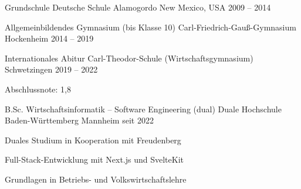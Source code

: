 \documentclass[11pt, a4paper]{awesome-cv}
\begin{document}
\makecvheader


\begin{cventries}

\cventry
  {Grundschule}
  {Deutsche Schule Alamogordo}
  {New Mexico, USA}
  {2009 -- 2014}
  {}

\cventry
  {Allgemeinbildendes Gymnasium (bis Klasse 10)}
  {Carl-Friedrich-Gauß-Gymnasium}
  {Hockenheim}
  {2014 -- 2019}
  {}

\cventry
  {Internationales Abitur}
  {Carl-Theodor-Schule (Wirtschaftsgymnasium)}
  {Schwetzingen}
  {2019 -- 2022}
  {
    \begin{cvitems}
      \item {Abschlussnote: 1,8}
    \end{cvitems}
  }

\cventry
  {B.Sc. Wirtschaftsinformatik – Software Engineering (dual)}
  {Duale Hochschule Baden-Württemberg}
  {Mannheim}
  {seit 2022}
  {
    \begin{cvitems}
      \item {Duales Studium in Kooperation mit Freudenberg}
      \item {Full-Stack-Entwicklung mit Next.js und SvelteKit}
      \item {Grundlagen in Betriebs- und Volkswirtschaftslehre}
    \end{cvitems}
  }

\end{cventries}

\end{document}
